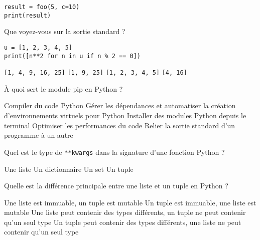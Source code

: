 \documentclass[french,a4paper,addpoints,11pt]{exam}
\begin{document}
\begin{questions}
\begin{lstlisting}
result = foo(5, c=10)
print(result)
\end{lstlisting}

    \fillwithlines{1cm}

    \question

    Que voyez-vous sur la sortie standard ?

    \begin{lstlisting}
u = [1, 2, 3, 4, 5]
print([n**2 for n in u if n % 2 == 0])
    \end{lstlisting}

    \begin{multicols}{2}
        \begin{checkboxes}
            \choice \lstinline|[1, 4, 9, 16, 25]|
            \choice \lstinline|[1, 9, 25]|
            \choice \lstinline|[1, 2, 3, 4, 5]|
            \CorrectChoice \lstinline|[4, 16]|
        \end{checkboxes}
    \end{multicols}
    \question

    À quoi sert le module pip en Python ?

    \begin{checkboxes}
        \choice Compiler du code Python
        \choice Gérer les dépendances et automatiser la création d'environnements virtuels pour Python
        \CorrectChoice Installer des modules Python depuis le terminal
        \choice Optimiser les performances du code
        \choice Relier la sortie standard d'un programme à un autre

    \end{checkboxes}

    \question

    Quel est le type de \lstinline|**kwargs| dans la signature d'une fonction Python ?
    \begin{multicols}{2}
        \begin{checkboxes}
            \choice Une liste
            \CorrectChoice Un dictionnaire
            \choice Un set
            \choice Un tuple
        \end{checkboxes}
    \end{multicols}

    \question

    Quelle est la différence principale entre une liste et un tuple en Python ?

    \begin{checkboxes}
        \choice Une liste est immuable, un tuple est mutable
        \CorrectChoice Un tuple est immuable, une liste est mutable
        \choice Une liste peut contenir des types différents, un tuple ne peut contenir qu'un seul type
        \choice Un tuple peut contenir des types différents, une liste ne peut contenir qu'un seul type
    \end{checkboxes}


\end{questions}
\end{document}
